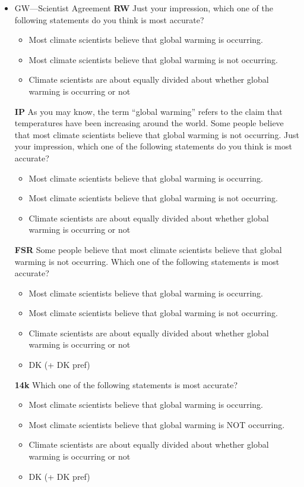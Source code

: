 \documentclass[12pt, letterpaper]{article}
\begin{document}
\begin{itemize}
\item GW—Scientist Agreement\newline
\textbf{RW}\newline
Just your impression, which one of the following statements do you think is most
accurate?
\begin{itemize}
	\item Most climate scientists believe that global warming is occurring.
	\item Most climate scientists believe that global warming is not occurring.
	\item Climate scientists are about equally divided about whether global warming is occurring or not
\end{itemize}

\textbf{IP}\newline
As you may know, the term ``global warming'' refers to the claim that temperatures
have been increasing around the world. Some people believe that most climate
scientists believe that global warming is not occurring. Just your impression, which
one of the following statements do you think is most accurate?
\begin{itemize}
	\item Most climate scientists believe that global warming is occurring.
	\item Most climate scientists believe that global warming is not occurring.
	\item Climate scientists are about equally divided about whether global warming is occurring or not
\end{itemize}
\textbf{FSR}\newline
Some people believe that most climate scientists believe that global warming is not
occurring. Which one of the following statements is most accurate?
\begin{itemize}
	\item Most climate scientists believe that global warming is occurring.
	\item Most climate scientists believe that global warming is not occurring.
	\item Climate scientists are about equally divided about whether global warming is occurring or not 
	\item DK (+ DK pref)
\end{itemize}

\textbf{14k}\newline
Which one of the following statements is most accurate?
\begin{itemize}
	\item Most climate scientists believe that global warming is occurring.
	\item Most climate scientists believe that global warming is NOT occurring.
	\item Climate scientists are about equally divided about whether global warming is occurring or not
	\item DK (+ DK pref)
\end{itemize}


\end{itemize}
\end{document}
